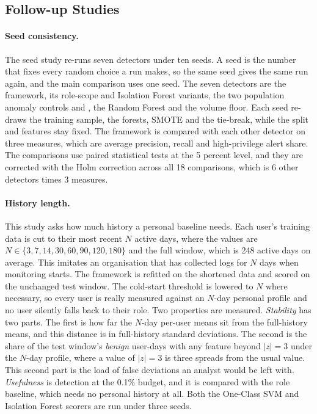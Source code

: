 \documentclass[a4paper,12pt]{article}
\begin{document}
\subsection{Follow-up Studies}
\label{sec:studies_method}
\paragraph{Seed consistency.} The seed study re-runs seven detectors under ten seeds. A seed is the number that fixes every random choice a run makes, so the same seed gives the same run again, and the main comparison uses one seed. The seven detectors are the framework, its role-scope and Isolation Forest variants, the two population anomaly controls  and , the Random Forest and the volume floor. Each seed re-draws the training sample, the forests, SMOTE and the tie-break, while the split and features stay fixed. The framework is compared with each other detector on three measures, which are average precision, recall and high-privilege alert share. The comparisons use paired statistical tests at the 5 percent level, and they are corrected with the Holm correction across all 18 comparisons, which is 6 other detectors times 3 measures.

\paragraph{History length.} This study asks how much history a personal baseline needs. Each user's training data is cut to their most recent $N$ active days, where the values are $N \in \{3, 7, 14, 30, 60, 90, 120, 180\}$ and the full window, which is 248 active days on average. This imitates an organisation that has collected logs for $N$ days when monitoring starts. The framework is refitted on the shortened data and scored on the unchanged test window. The cold-start threshold is lowered to $N$ where necessary, so every user is really measured against an $N$-day personal profile and no user silently falls back to their role. Two properties are measured. \emph{Stability} has two parts. The first is how far the $N$-day per-user means sit from the full-history means, and this distance is in full-history standard deviations. The second is the share of the test window's \emph{benign} user-days with any feature beyond $|z|=3$ under the $N$-day profile, where a value of $|z|=3$ is three spreads from the usual value. This second part is the load of false deviations an analyst would be left with. \emph{Usefulness} is detection at the 0.1\% budget, and it is compared with the role baseline, which needs no personal history at all. Both the One-Class SVM and Isolation Forest scorers are run under three seeds.
\end{document}
